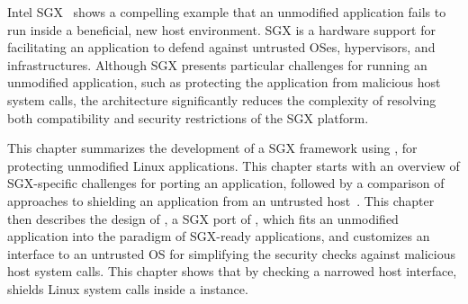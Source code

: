 Intel SGX~\cite{intelsgx} shows a compelling example that an unmodified application fails to run inside a beneficial, new host environment.
SGX is a hardware support
for facilitating an application to defend against untrusted OSes, hypervisors, and infrastructures.
Although SGX presents particular challenges for running an unmodified application, such as protecting the application
from malicious host system calls,
the \graphene{} architecture significantly reduces the complexity
of resolving both compatibility and security restrictions of the SGX platform.


This chapter summarizes the development of a SGX framework using \graphene{}, for protecting unmodified Linux applications.
This chapter starts with an overview of SGX-specific challenges
for porting an application,
followed by a comparison of approaches to shielding an application from an untrusted host~\cite{osdi16scone,shinde17panoply,baumann14haven}.
This chapter then describes the design of \graphenesgx{},
a SGX port of \graphene{},
which fits an unmodified application into the paradigm of SGX-ready applications,
and customizes an interface to an untrusted OS
for simplifying the security checks against malicious host system calls.
This chapter shows
that by checking a narrowed host interface,
\graphenesgx{} shields Linux system calls inside a \thelibos{} instance.

